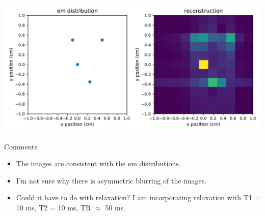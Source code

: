 \documentclass[dvipsnames]{beamer}
\begin{document}
\begin{frame}
\begin{center}
\includegraphics[width=\textwidth]{reconstruction_ems-scattered}
\end{center}
\end{frame}

\begin{frame}{Comments}
\begin{itemize}
\item The images are consistent with the em distributions.
\item I'm not sure why there is asymmetric blurring of the images.
\item Could it have to do with relaxation? I am incorporating relaxation with T1 = 10 ms, T2 = 10 ms, TR $\approx$ 50 ms.
\end{itemize}
\end{frame}
\end{document}
